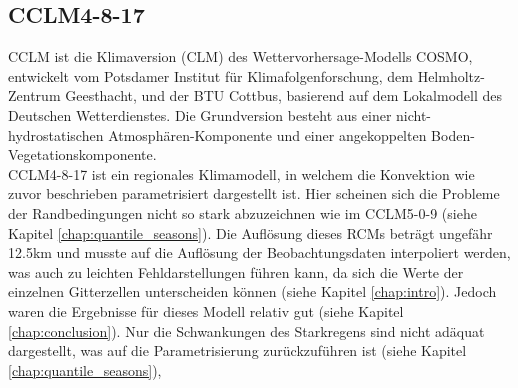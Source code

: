 \subsection{CCLM4-8-17}
CCLM ist die Klimaversion (CLM) des Wettervorhersage-Modells COSMO, entwickelt vom Potsdamer Institut für Klimafolgenforschung, dem Helmholtz-Zentrum Geesthacht, und der BTU Cottbus, basierend auf dem Lokalmodell des Deutschen Wetterdienstes. Die Grundversion besteht aus einer nicht-hydrostatischen Atmosphären-Komponente und einer angekoppelten Boden-Vegetationskomponente.\\
CCLM4-8-17 ist ein regionales Klimamodell, in welchem die Konvektion wie zuvor beschrieben parametrisiert dargestellt ist. Hier scheinen sich die Probleme der Randbedingungen nicht so stark abzuzeichnen wie im CCLM5-0-9 (siehe Kapitel \ref{chap:quantile_seasons}). Die Auflösung dieses RCMs beträgt ungefähr 12.5km und musste auf die Auflösung der Beobachtungsdaten interpoliert werden, was auch zu leichten Fehldarstellungen führen kann, da sich die Werte der einzelnen Gitterzellen unterscheiden können (siehe Kapitel \ref{chap:intro}). Jedoch waren die Ergebnisse für dieses Modell relativ gut (siehe Kapitel \ref{chap:conclusion}). Nur die Schwankungen des Starkregens sind nicht adäquat dargestellt, was auf die Parametrisierung zurückzuführen ist (siehe Kapitel \ref{chap:quantile_seasons}),
